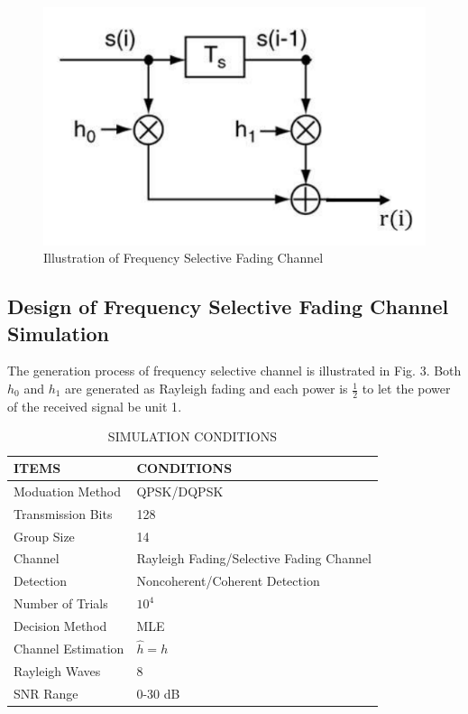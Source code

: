 \documentclass[technicalreport]{ieicej}
\begin{document}
\begin{figure}[H]
	\begin{center}
		\vspace{0cm}
		\includegraphics[width=\linewidth,clip]{fig/select_model.pdf}
		\caption{Illustration of Frequency Selective Fading Channel}
		\label{fig:sample}
	\end{center}
\end{figure}

\subsection{Design of Frequency Selective Fading Channel Simulation}
The generation process of frequency selective channel is illustrated in Fig. 3. Both $h_0$ and $h_1$ are generated as Rayleigh fading and each power is $\frac{1}{2}$ to let the power of the received signal be unit 1\cite{select}. 

\begin{table}[H]
	\begin{center}
	\caption{SIMULATION CONDITIONS}
	\label{tbl:simu}
	\small
	\begin{tabular}{ll}
	\hline
	ITEMS & CONDITIONS\\
	\hline
	Moduation Method & QPSK/DQPSK \\
	Transmission Bits & 128 \\
	Group Size & 14 \\
	Channel & Rayleigh Fading/Selective Fading Channel \\
	Detection & Noncoherent/Coherent Detection \\
	Number of Trials & $10^{4}$ \\
	Decision Method & MLE \\
	Channel Estimation & $\hat{h}=h$ \\
	Rayleigh Waves & 8 \\
	SNR Range & 0-30 dB \\
	\hline
	\end{tabular}
	\end{center}
\end{table}
\end{document}
